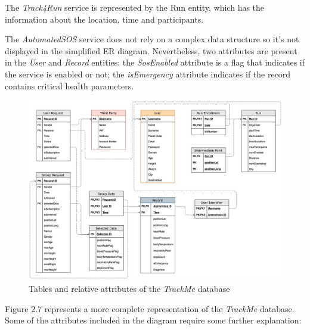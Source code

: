 The \textit{Track4Run} service is represented by the Run entity, which has the information about the location, time and participants.

The \textit{AutomatedSOS} service does not rely on a complex data structure so it’s not displayed in the simplified ER diagram. Nevertheless, two attributes are present in the \textit{User} and \textit{Record} entities: the \textit{SosEnabled} attribute is a flag that indicates if the service is enabled or not; the \textit{isEmergency} attribute indicates if the record contains critical health parameters.

\begin{figure}[H]
\includegraphics[scale=0.17,keepaspectratio]{./Pictures/ER-tables.png}
\centering
\caption{Tables and relative attributes of the \textit{TrackMe} database}
\end{figure}

Figure 2.7 represents a more complete representation of the \textit{TrackMe} database. Some of the attributes included in the diagram require some further explanation:

